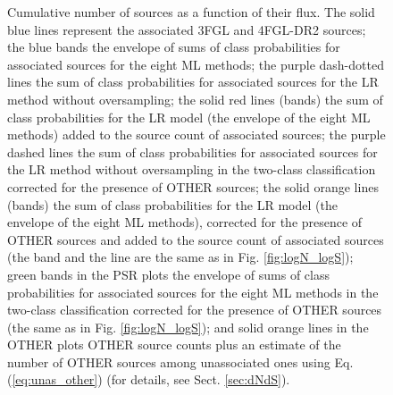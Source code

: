 \documentclass[referee]{aa} %
\begin{document}
\begin{figure}[h]
\caption{Cumulative number of sources as a function of their flux. 
The solid blue lines represent the associated 3FGL and 4FGL-DR2  sources; the blue bands the envelope of sums of class probabilities for associated sources for the eight ML methods;  
the purple dash-dotted lines the sum of class probabilities for associated sources for the LR method without oversampling; the solid red lines (bands) the sum of class probabilities for the LR model (the envelope of the eight ML methods) added to the source count of associated sources; the purple dashed lines the sum of class probabilities for associated sources for the LR method without oversampling in the two-class classification corrected for the presence of OTHER sources; the solid orange lines (bands) the sum of class probabilities for the LR model (the envelope of the eight ML methods), corrected for the presence of OTHER sources and added to the source count of associated sources (the band and the line are the same as in Fig. \ref{fig:logN_logS}); green bands in the PSR plots the envelope of sums of class probabilities for associated sources for the eight ML methods in the two-class classification corrected for the presence of OTHER sources (the same as in Fig. \ref{fig:logN_logS}); and solid orange lines in the OTHER plots OTHER source counts plus an estimate of the number of OTHER sources among unassociated ones using Eq. (\ref{eq:unas_other}) (for details, see Sect. \ref{sec:dNdS}).
}  
\label{fig:logN_logS_3classes}
\end{figure}
\end{document}
